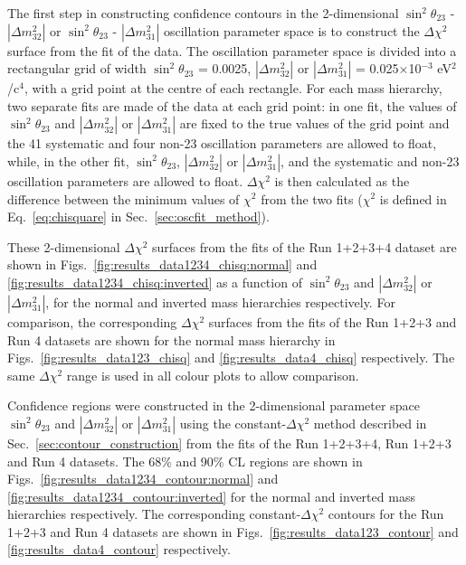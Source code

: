 The first step in constructing confidence contours in the 2-dimensional $\sin^{2}\theta_{23}$ - $|\Delta m^{2}_{32}|$ or 
$\sin^{2}\theta_{23}$ - $|\Delta m^{2}_{31}|$
oscillation parameter space is to construct the $\Delta\chi^2$ surface from the fit of the data.
The oscillation parameter space is divided into a rectangular grid of width $\sin^{2}\theta_{23}$ = 0.0025, $|\Delta m^{2}_{32}|$ 
or $|\Delta m^{2}_{31}|$ = 0.025$\times$10$^{-3}$ eV$^{2}$/c$^{4}$, with a grid point at the centre of each rectangle. For each 
mass hierarchy, two separate fits are made of 
the data at each grid point: in one fit, the values of $\sin^{2}\theta_{23}$ and $|\Delta m^{2}_{32}|$ or $|\Delta m^{2}_{31}|$ 
are fixed to the true values of the grid point and the 41 systematic and four non-23 oscillation parameters are allowed to float, 
while, in the other fit, $\sin^{2}\theta_{23}$, $|\Delta m^{2}_{32}|$ or $|\Delta m^{2}_{31}|$,  and the systematic and non-23 
oscillation parameters are allowed to float. $\Delta\chi^2$ is then calculated as the 
difference between the minimum values of $\chi^{2}$ from the two fits ($\chi^{2}$ is defined in Eq.\
\ref{eq:chisquare} in Sec.\ \ref{sec:oscfit_method}).

These 2-dimensional $\Delta\chi^2$ surfaces from the fits of the Run 1+2+3+4 dataset are shown in
Figs.\ \ref{fig:results_data1234_chisq:normal} and \ref{fig:results_data1234_chisq:inverted}
as a function of $\sin^{2}\theta_{23}$ and $|\Delta m^{2}_{32}|$ or $|\Delta m^{2}_{31}|$,
for the normal and inverted mass hierarchies respectively.
For comparison, the corresponding $\Delta\chi^2$ surfaces from the fits of the Run 1+2+3 and Run 4
datasets are shown for the normal mass hierarchy 
in Figs.\ \ref{fig:results_data123_chisq} and \ref{fig:results_data4_chisq} respectively.
The same $\Delta\chi^2$ range is used in all colour plots to allow comparison.

Confidence regions were constructed in the 2-dimensional parameter space $\sin^{2}\theta_{23}$ and $|\Delta m^{2}_{32}|$ or $|\Delta m^{2}_{31}|$
using the constant-$\Delta\chi^2$ method described in Sec.\ \ref{sec:contour_construction} from the
fits of the Run 1+2+3+4, Run 1+2+3 and Run 4 datasets.
The 68\% and 90\% CL regions are shown
in Figs.\ \ref{fig:results_data1234_contour:normal} and \ref{fig:results_data1234_contour:inverted}
for the normal and inverted mass hierarchies respectively.
The corresponding constant-$\Delta\chi^2$ contours for the Run 1+2+3 and Run 4 datasets are shown
in Figs.\ \ref{fig:results_data123_contour} and \ref{fig:results_data4_contour} respectively.

